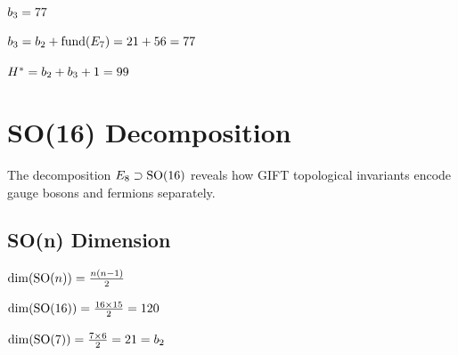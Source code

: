 \begin{theorem}[b3 Value]\label{thm:b3_eq}
    \leanok
    $b_3 = 77$
\end{theorem}

\begin{theorem}[b3 from E7]\label{thm:b3_from_E7}
    \leanok
    $b_3 = b_2 + \mathrm{fund}(E_7) = 21 + 56 = 77$
\end{theorem}

\begin{definition}[H-star]\label{def:H_star}
    \leanok
    $H^* = b_2 + b_3 + 1 = 99$
\end{definition}

\chapter{SO(16) Decomposition}\label{chap:so16}

The decomposition $E_8 \supset \mathrm{SO}(16)$ reveals how GIFT topological invariants
encode gauge bosons and fermions separately.

\section{SO(n) Dimension}

\begin{definition}[SO(n) Dimension]\label{def:dim_SO}
    \leanok
    $\mathrm{dim}(\mathrm{SO}(n)) = \frac{n(n-1)}{2}$
\end{definition}

\begin{theorem}[SO(16) = 120]\label{thm:dim_SO16}
    \leanok
    $\mathrm{dim}(\mathrm{SO}(16)) = \frac{16 \times 15}{2} = 120$
\end{theorem}

\begin{theorem}[SO(7) = b2]\label{thm:dim_SO7}
    \leanok
    $\mathrm{dim}(\mathrm{SO}(7)) = \frac{7 \times 6}{2} = 21 = b_2$
\end{theorem}


